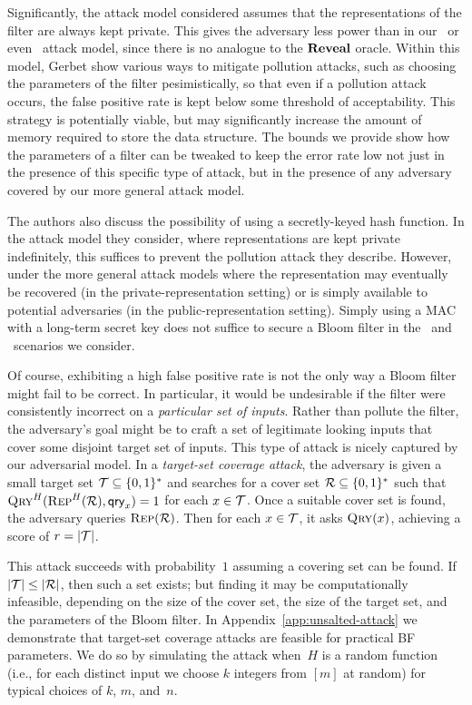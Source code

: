 Significantly, the attack model considered assumes that the representations of
the filter are always kept private. This gives the adversary less power than in
our \errep\ or even \erreps\ attack model, since there is no analogue to the
$\mathbf{Reveal}$ oracle. Within this model, Gerbet \etal show various ways to mitigate
pollution attacks, such as choosing the parameters of the filter pesimistically,
so that even if a pollution attack occurs, the false positive rate is kept below
some threshold of acceptability. This strategy is  potentially viable, but may
significantly increase the amount of memory required to store the data structure.
The bounds we provide show how the parameters of a filter can be tweaked to keep
the error rate low not just in the presence of this specific type of attack, but
in the presence of any adversary covered by our more general attack model.

The authors also discuss the possibility of using a secretly-keyed
hash function. In the attack model they consider, where representations are kept
private indefinitely, this suffices to prevent the pollution attack they
describe. However, under the more general attack models where the representation
may eventually be recovered (in the private-representation setting) or is simply
available to potential adversaries (in the public-representation setting).
Simply using a MAC with a long-term secret key does not suffice to
secure a Bloom filter in the \errep\ and \erreps\ scenarios we consider.

%
Of course, exhibiting a high false positive rate is not the only way a Bloom
filter might fail to be correct. In particular, it would be undesirable if the
filter were consistently incorrect on a \emph{particular set of inputs}. Rather
than pollute the filter, the adversary's goal might be to craft a set of
legitimate looking inputs that cover some disjoint target set of inputs.
%
This type of attack is nicely captured by our adversarial model.
%
In a \emph{target-set coverage attack}, the adversary is given a small target set
$\mathcal{T}\subseteq\{0,1\}^*$ and searches for a cover set $\mathcal{R}\subseteq\{0,1\}^*$
such that $\textnormal{\textsc{Qry}}^H(\textnormal{\textsc{Rep}}^H(\mathcal{R}),\mathsf{qry}_x)=1$ for each $x\in\mathcal{T}$.
%
Once a suitable cover set is found, the adversary queries $\textnormal{\textsc{Rep}}(\mathcal{R})$. Then
for each $x\in\mathcal{T}$, it asks $\textnormal{\textsc{Qry}}(x)$, achieving a score of $r = |\mathcal{T}|$.

This  attack succeeds with probability~$1$ assuming a covering set can
be found.  If $|\mathcal{T}| \leq |\mathcal{R}|$, then such a set exists; but finding it may be
computationally infeasible, depending on the size of the cover set, the size of
the target set, and the parameters of the Bloom filter.
%
In Appendix~\ref{app:unsalted-attack} we demonstrate that target-set coverage
attacks are feasible for practical BF parameters. We do so by simulating the
attack when~$H$ is a random function (i.e., for each distinct input we choose
$k$ integers from $[m]$ at random) for typical choices of $k$, $m$, and~$n$.
%

